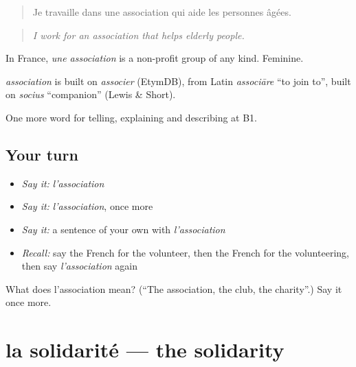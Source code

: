 \begin{quote}
Je travaille dans une association qui aide les personnes âgées.
\end{quote}

\begin{quote}
\emph{I work for an association that helps elderly people.}
\end{quote}

In France, \emph{une association} is a non-profit group of any kind. Feminine.

\begin{cousinweb}
\emph{association} is built on \emph{associer} (EtymDB), from Latin \emph{associāre} \textquotedblleft{}to join to\textquotedblright{}, built on \emph{socius} \textquotedblleft{}companion\textquotedblright{} (Lewis \& Short).
\end{cousinweb}

\begin{grammarlens}[title={What you've built}]
One more word for telling, explaining and describing at B1.
\end{grammarlens}

\subsection*{Your turn}
\begin{itemize}
\raggedright
  \item \emph{Say it:} \emph{l'association}
  \item \emph{Say it:} \emph{l'association}, once more
  \item \emph{Say it:} a sentence of your own with \emph{l'association}
  \item \emph{Recall:} say the French for the volunteer, then the French for the volunteering, then say \emph{l'association} again
\end{itemize}

\begin{tcolorbox}[breakable,colback=teal!4,colframe=teal!35!black,title={Before you move on}]
What does l'association mean? (\textquotedblleft{}The association, the club, the charity\textquotedblright{}.) Say it once more.
\end{tcolorbox}
\section[la solidarité]{la solidarité — the solidarity}

\label{lesson:FR-C366-solidarite}



